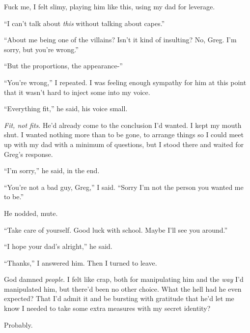 Fuck me, I felt slimy, playing him like this, using my dad for leverage.



``I can't talk about \emph{this} without talking about capes.''



``About me being one of the villains?  Isn't it kind of insulting?  No, Greg.  I'm sorry, but you're wrong.''



``But the proportions, the appearance-''



``You're wrong,'' I repeated.  I was feeling enough sympathy for him at this point that it wasn't hard to inject some into my voice.



``Everything fit,'' he said, his voice small.



\emph{Fit, not fits}.  He'd already come to the conclusion I'd wanted.  I kept my mouth shut.  I wanted nothing more than to be gone, to arrange things so I could meet up with my dad with a minimum of questions, but I stood there and waited for Greg's response.



``I'm sorry,'' he said, in the end.



``You're not a bad guy, Greg,'' I said.  ``Sorry I'm not the person you wanted me to be.''



He nodded, mute.



``Take care of yourself.  Good luck with school.  Maybe I'll see you around.''



``I hope your dad's alright,'' he said.



``Thanks,'' I answered him.  Then I turned to leave.



God damned \emph{people}.  I felt like crap, both for manipulating him and the \emph{way} I'd manipulated him, but there'd been no other choice.  What the hell had he even expected?  That I'd admit it and be bursting with gratitude that he'd let me know I needed to take some extra measures with my secret identity?



Probably.



